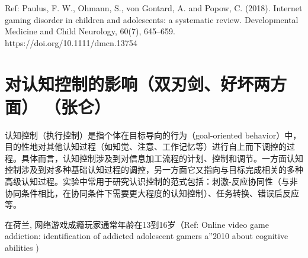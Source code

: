 Ref: Paulus, F. W., Ohmann, S., von Gontard, A. and  Popow, C. (2018). Internet gaming disorder in children and adolescents: a systematic review. Developmental Medicine and Child Neurology, 60(7), 645–659. https://doi.org/10.1111/dmcn.13754


\section{对认知控制的影响（双刃剑、好坏两方面） （张仑）
}




 认知控制（执行控制）是指个体在目标导向的行为（goal-oriented behavior）中，目的性地对其他认知过程（如知觉、注意、工作记忆等）进行自上而下调控的过程。具体而言，认知控制涉及到对信息加工流程的计划、控制和调节。一方面认知控制涉及到对多种基础认知过程的调控，另一方面它又指向与目标完成相关的多种高级认知过程。实验中常用于研究认识控制的范式包括：刺激-反应协同性（与非协同条件相比，在协同条件下需要更大程度的认知控制）、任务转换、错误后反应等。
  
在荷兰, 网络游戏成瘾玩家通常年龄在13到16岁（Ref: Online video game addiction: identification of addicted adolescent gamers a”2010 about cognitive abilities \cite{})


